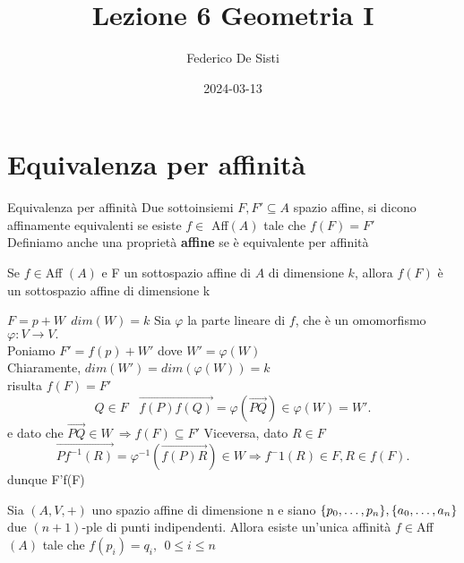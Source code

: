 \documentclass[12px]{article}
\title{Lezione 6 Geometria I}
\date{2024-03-13}
\author{Federico De Sisti}
\begin{document}
	\maketitle
	\newpage
	\section{Equivalenza per affinità}
	\begin{defi}{Equivalenza per affinità}
		Due sottoinsiemi $F, F'\subseteq A$ spazio affine, si dicono affinamente equivalenti se esiste $f\in$ Aff$(A)$ tale che $f(F) = F'$\\
		Definiamo anche una proprietà \textbf{affine} se è equivalente per affinità
	\end{defi}
	\begin{prop}{}{}
		Se $f\in$Aff $(A)$ e F un sottospazio affine di $A$ di dimensione $k$, allora $f(F)$ è un sottospazio affine di dimensione k
	\end{prop}
	\begin{dimo} 
		$F = p + W \ \ dim(W) = k$ Sia $\varphi$ la parte lineare di $f$, che è un omomorfismo $\varphi:V \rightarrow V.$\\
		Poniamo $F' = f(p) + W'$ dove $W' = \varphi(W)$\\
		Chiaramente, $dim(W') = dim(\varphi(W)) = k$ \\
		risulta $f(F) = F'$\\ \[
		Q\in F \ \ \ \ \overrightarrow{f(P)f(Q)} = \varphi(\overrightarrow{PQ})\in \varphi(W) = W'
		.\] 
		e dato che $ \overrightarrow{PQ}\in W \ \Rightarrow f(F)\subseteq F'$
		Viceversa, dato $R\in F$ 
		\[
			\overrightarrow{Pf^{-1}(R)} = \varphi^{-1}(\overrightarrow{f(P)R})\in W \Rightarrow  f^-1(R) \in F, R\in f(F)
		.\] 
		dunque F'\subseteq f(F)
	\end{dimo}
	\begin{teo}
		Sia $(A, V, +)$ uno spazio affine di dimensione n e siano $\{p_0,\ldots,p_n\}, \\ \{a_0,\ldots,a_n\}$ due $(n+1)$-ple di punti indipendenti. Allora esiste un'unica affinità $f\in$Aff$(A)$ tale che $f(p_i) = q_i, \ \ 0\leq i\leq n$
	\end{teo}
\end{document}

